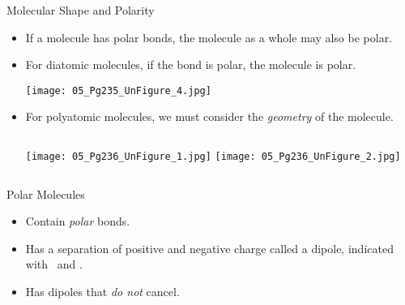 \documentclass[notes=hide]{beamer}
\begin{document}
\begin{frame}{Molecular Shape and Polarity}
	\begin{itemize}
		\item If a molecule has polar bonds, the molecule as a whole may
			also be polar. \pause
		\item For diatomic molecules, if the bond is polar, the molecule
			is polar.

			\begin{center}
				\texttt{[image: 05\_Pg235\_UnFigure\_4.jpg]}
			\end{center}

			\pause

		\item For polyatomic molecules, we must consider the
			\emph{geometry} of the molecule.

			\begin{columns}
				\centering
				\texttt{[image: 05\_Pg236\_UnFigure\_1.jpg]}
				\centering
				\texttt{[image: 05\_Pg236\_UnFigure\_2.jpg]}
			\end{columns}
	\end{itemize}
\end{frame}

\begin{frame}{Polar Molecules}
	\begin{itemize}
		\item Contain \emph{polar} bonds.
		\item Has a separation of positive and negative charge called a
			dipole, indicated with \delp\ and \delm.
		\item Has dipoles that \emph{do not} cancel.
	\end{itemize}

	\bigskip

	\begin{center}
		\hspace{5em}
	\end{center}
\end{frame}
\end{document}
